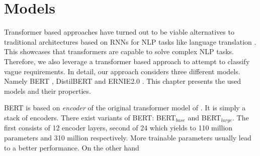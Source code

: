 \section{Models}
\label{chp:approach:sec:models}

Transformer based approaches have turned out to be viable alternatives to traditional architectures based on \acp{RNN} for \ac{NLP} tasks like language translation \parencites{Gehring:2017}{Vaswani:2017}.
This showcases that transformers are capable to solve complex \ac{NLP} tasks.
Therefore, we also leverage a transformer based approach to attempt to classify vague requirements.
In detail, our approach considers three different models.
Namely \ac{BERT} \parencite{Devlin:2018}, \ac{DistilBERT} \parencite{Sanh:2019} and \ac{ERNIE2.0} \parencite{Sun:2019a}.
This chapter presents the used models and their properties.

\Ac{BERT} is based on \textit{encoder} of the original transformer model of \textcite{Vaswani:2017}.
It is simply a stack of encoders.
There exist variants of \ac{BERT}: \ac{BERT}$_{base}$ and \ac{BERT}$_{large}$.
The first consists of 12 encoder layers, second of 24 which yields to 110 million parameters and 310 million respectively.
More trainable parameters usually lead to a better performance.
On the other hand
